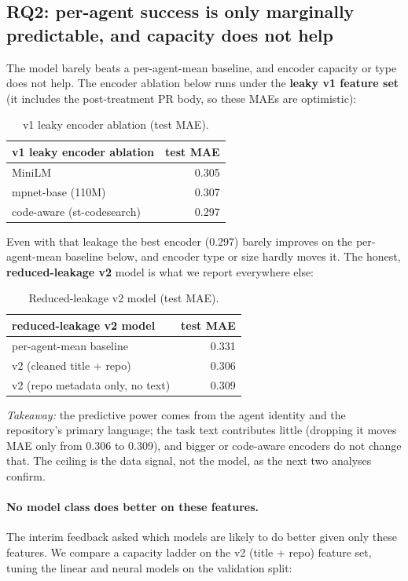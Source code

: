 \documentclass[sigconf,nonacm]{acmart}
\begin{document}
\subsection{RQ2: per-agent success is only marginally predictable, and capacity does not help}\label{sec:rq2}

The model barely beats a per-agent-mean baseline, and encoder capacity or type does not help. The encoder ablation below runs under the \textbf{leaky v1 feature set} (it includes the post-treatment PR body, so these MAEs are optimistic):

\begin{table}[h]
  \centering
  \caption{v1 leaky encoder ablation (test MAE).}
  \begin{tabular}{lr}
    \toprule
    v1 leaky encoder ablation & test MAE \\
    \midrule
    MiniLM & 0.305 \\
    mpnet-base (110M) & 0.307 \\
    code-aware (st-codesearch) & 0.297 \\
    \bottomrule
  \end{tabular}
\end{table}

Even with that leakage the best encoder (0.297) barely improves on the per-agent-mean baseline below, and encoder type or size hardly moves it. The honest, \textbf{reduced-leakage v2} model is what we report everywhere else:

\begin{table}[h]
  \centering
  \caption{Reduced-leakage v2 model (test MAE).}
  \begin{tabular}{lr}
    \toprule
    reduced-leakage v2 model & test MAE \\
    \midrule
    per-agent-mean baseline & 0.331 \\
    v2 (cleaned title + repo) & 0.306 \\
    v2 (repo metadata only, no text) & 0.309 \\
    \bottomrule
  \end{tabular}
\end{table}

\emph{Takeaway:} the predictive power comes from the agent identity and the repository's primary language; the task text contributes little (dropping it moves MAE only from 0.306 to 0.309), and bigger or code-aware encoders do not change that. The ceiling is the data signal, not the model, as the next two analyses confirm.

\paragraph{No model class does better on these features.} The interim feedback asked which models are likely to do better given only these features. We compare a capacity ladder on the v2 (title + repo) feature set, tuning the linear and neural models on the validation split:
\end{document}
